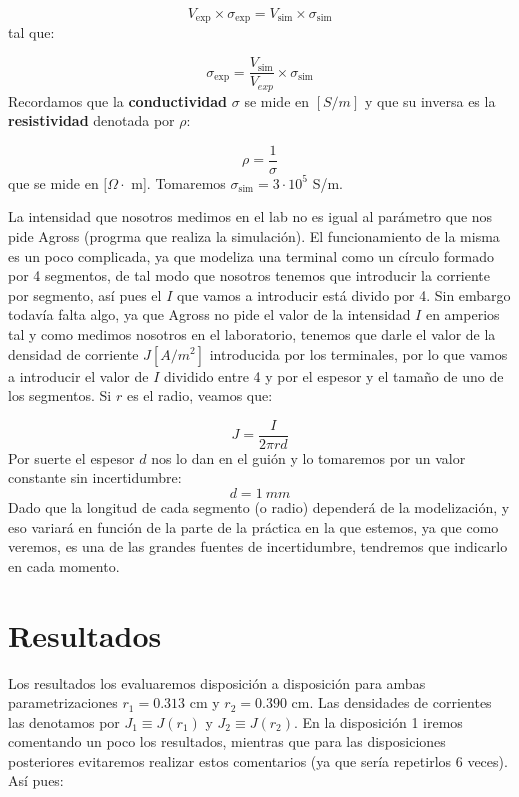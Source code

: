 \documentclass[11pt]{article}
\newcommand{\simu}{\text{sim}}
\begin{document}
\begin{equation}
	V_{\exp} \times \sigma_{\exp} = V_{\simu} \times \sigma_{\simu}
\end{equation}
tal que: 

\begin{equation}
	\sigma_{\exp} =  \frac{V_{\simu}}{V_{exp}} \times \sigma_{\simu}
\end{equation}
Recordamos que la \textbf{conductividad} $\sigma$ se mide en $[S / m]$ y que su inversa es la \textbf{resistividad} denotada por $\rho$:

\begin{equation}
	\rho = \frac{1}{\sigma}
\end{equation}
que se mide en $[\Omega \cdot $ m]. Tomaremos $\sigma_{\simu}=3\cdot 10^5$ S/m.

La intensidad que nosotros medimos en el lab no es igual al parámetro que nos pide Agross (progrma que realiza la simulación). El funcionamiento de la misma es un poco complicada, ya que modeliza una terminal como un círculo formado por 4 segmentos, de tal modo que nosotros tenemos que introducir la corriente por segmento, así pues el $I$ que vamos a introducir está divido por 4. Sin embargo todavía falta algo, ya que Agross no pide el valor de la intensidad $I$ en amperios tal y como medimos nosotros en el laboratorio, tenemos que darle el valor de la densidad de corriente $J [\unit{A/m^2}]$ introducida por los terminales, por lo que vamos a introducir el valor de $I$ dividido entre 4 y por el espesor y el tamaño de uno de los segmentos. Si $r$ es el radio, veamos que:

\begin{equation}
	J = \frac{I}{2 \pi r d}
\end{equation}
Por suerte el espesor $d$ nos lo dan en el guión y lo tomaremos por un valor constante sin incertidumbre:
\begin{equation}
	d = 1 \ \unit{mm}
\end{equation}
Dado que la longitud de cada segmento (o radio) dependerá de la modelización, y eso variará en función de la parte de la práctica en la que estemos, ya que como veremos, es una de las grandes fuentes de incertidumbre, tendremos que indicarlo en cada momento.


\section{Resultados}

Los resultados los evaluaremos disposición a disposición para ambas parametrizaciones $r_1=0.313$ cm y $r_2=0.390$ cm. Las densidades de corrientes las denotamos por $J_1\equiv J(r_1)$ y $J_2\equiv J(r_2)$. En la disposición 1 iremos comentando un poco los resultados, mientras que para las disposiciones posteriores evitaremos realizar estos comentarios (ya que sería repetirlos 6 veces). Así pues: 
\end{document}
